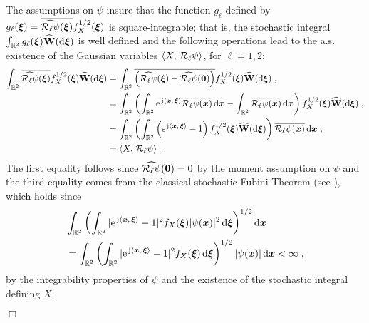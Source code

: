 \documentclass{elsarticle}
\newenvironment{proof}{\medskip\noindent{\bf Proof.}\;}{\null\hfill $\Box$\par\medskip }
\begin{document}
%
\begin{proof} The assumptions on $\psi$ insure that the function $g_{\ell}$ defined by $g_{\ell}(\bm{\xi})=\overline{\widehat{\mathcal{R}_{\ell}\psi}(\bm{\xi})}f_X^{1/2}(\bm{\xi})$ is square-integrable; that is, the stochastic integral $\int_{ \mathbb{R}^2}^{} g_{\ell}(\bm{\xi})\mathbf{\widehat{W}}(\mathop{}\mathopen{}\mathrm{d} \bm{\xi})$ is well defined and the following operations lead to the a.s. existence of the Gaussian variables $\left \langle X,\, \mathcal{R}_{\ell}\psi\right \rangle$, for $\ell =1,2$:
\begin{align*}
\int_{\mathbb{R}^2}
\overline{\widehat{\mathcal{R}_{\ell}\psi}(\bm{\xi}) }
f_X^{1/2}(\bm{\xi})\mathbf{\widehat{W}}(\mathop{}\mathopen{}\mathrm{d} \bm{\xi})
&=\int_{\mathbb{R}^2}
\overline{ \left(\widehat{\mathcal{R}_{\ell}\psi}(\bm{\xi})-\widehat{\mathcal{R}_{\ell}\psi}(\bm{0})\right)}
 f_X^{1/2}(\bm{\xi})\widehat{\mathbf{W}}(\mathop{}\mathopen{}\mathrm{d} \bm{\xi})\;,\\
 &=\int_{\mathbb{R}^2} \left(\int_{\mathbb{R}^2}\mathrm{e}^{\, \mathrm{j} \left \langle \bm{x},\, \bm{\xi}\right \rangle}
\overline{\mathcal{R}_{\ell}\psi(\bm{x})}
\mathop{}\mathopen{}\mathrm{d} \bm{x}-\int_{\mathbb{R}^2}
\overline{\mathcal{R}_{\ell}\psi(\bm{x})}
\mathop{}\mathopen{}\mathrm{d} \bm{x}\right)f_X^{1/2}(\bm{\xi})\widehat{\mathbf{W}}(\mathop{}\mathopen{}\mathrm{d} \bm{\xi})\;,\\
&=\int_{\mathbb{R}^2}\left(\int_{\mathbb{R}^2}\left(\mathrm{e}^{\, \mathrm{j} \left \langle \bm{x},\, \bm{\xi}\right \rangle}-1\right)f_X^{1/2}(\bm{\xi})\widehat{\mathbf{W}}(\mathop{}\mathopen{}\mathrm{d} \bm{\xi})\right)
\overline{\mathcal{R}_{\ell}\psi(\bm{x})}
\mathop{}\mathopen{}\mathrm{d} \bm{x}\;,\\
&=\left \langle X,\, \mathcal{R}_{\ell}\psi\right \rangle\;.
\end{align*}
The first equality follows since $\widehat{\mathcal{R}_{\ell}\psi}(\bm{0})=0$ by the moment assumption on $\psi$ and the third equality comes from the classical stochastic Fubini Theorem (see \cite{pipiras2010regularization}), which holds since
\begin{align*}
&\int_{\mathbb{R}^2} \left(\int_{\mathbb{R}^2}|\mathrm{e}^{\, \mathrm{j} \left \langle \bm{x},\, \bm{\xi}\right \rangle}-1|^2 f_X(\bm{\xi})|\psi(\bm{x})|^2\mathop{}\mathopen{}\mathrm{d}\bm{\xi}\right)^{1/2}\mathop{}\mathopen{}\mathrm{d} \bm{x}\\
&=\int_{\mathbb{R}^2} \left(\int_{\mathbb{R}^2}|\mathrm{e}^{\, \mathrm{j} \left \langle \bm{x},\, \bm{\xi}\right \rangle}-1|^2 f_X(\bm{\xi})\mathop{}\mathopen{}\mathrm{d}\bm{\xi}\right)^{1/2}|\psi(\bm{x})|\mathop{}\mathopen{}\mathrm{d} \bm{x}<\infty\;,
\end{align*}
by the integrability properties of $\psi$ and the existence of the stochastic integral defining $X$. 


\end{proof}
\end{document}
